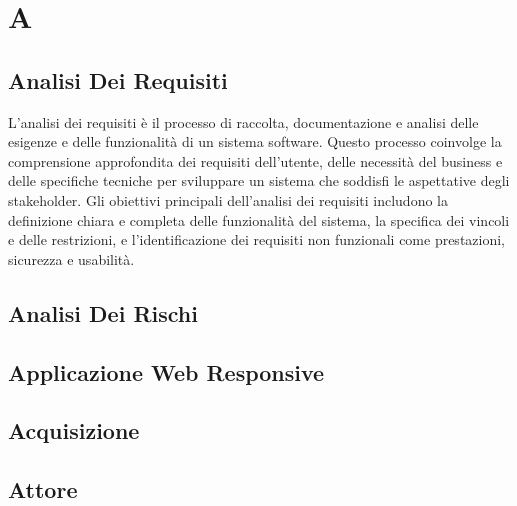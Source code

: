 \section{A} 
\subsection{Analisi Dei Requisiti} 
L'analisi dei requisiti è il processo di raccolta, documentazione e analisi delle esigenze e delle funzionalità di un sistema software. Questo processo coinvolge la comprensione approfondita dei requisiti dell'utente, delle necessità del business e delle specifiche tecniche per sviluppare un sistema che soddisfi le aspettative degli stakeholder. Gli obiettivi principali dell'analisi dei requisiti includono la definizione chiara e completa delle funzionalità del sistema, la specifica dei vincoli e delle restrizioni, e l'identificazione dei requisiti non funzionali come prestazioni, sicurezza e usabilità.
\subsection{Analisi Dei Rischi} 

\subsection{Applicazione Web Responsive} 

\subsection{Acquisizione} 

\subsection{Attore} 

